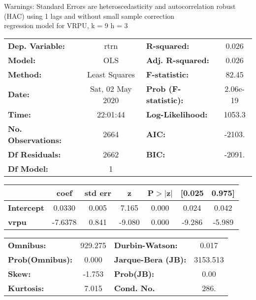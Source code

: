 Warnings: \newline
 [1] Standard Errors are heteroscedasticity and autocorrelation robust (HAC) using 1 lags and without small sample correction\\ 

regression model for VRPU, k = 9 h = 3\begin{center}
\begin{tabular}{lclc}
\toprule
\textbf{Dep. Variable:}    &       rtrn       & \textbf{  R-squared:         } &     0.026   \\
\textbf{Model:}            &       OLS        & \textbf{  Adj. R-squared:    } &     0.026   \\
\textbf{Method:}           &  Least Squares   & \textbf{  F-statistic:       } &     82.45   \\
\textbf{Date:}             & Sat, 02 May 2020 & \textbf{  Prob (F-statistic):} &  2.06e-19   \\
\textbf{Time:}             &     22:01:44     & \textbf{  Log-Likelihood:    } &    1053.3   \\
\textbf{No. Observations:} &        2664      & \textbf{  AIC:               } &    -2103.   \\
\textbf{Df Residuals:}     &        2662      & \textbf{  BIC:               } &    -2091.   \\
\textbf{Df Model:}         &           1      & \textbf{                     } &             \\
\bottomrule
\end{tabular}
\begin{tabular}{lcccccc}
                   & \textbf{coef} & \textbf{std err} & \textbf{z} & \textbf{P$> |$z$|$} & \textbf{[0.025} & \textbf{0.975]}  \\
\midrule
\textbf{Intercept} &       0.0330  &        0.005     &     7.165  &         0.000        &        0.024    &        0.042     \\
\textbf{vrpu}      &      -7.6378  &        0.841     &    -9.080  &         0.000        &       -9.286    &       -5.989     \\
\bottomrule
\end{tabular}
\begin{tabular}{lclc}
\textbf{Omnibus:}       & 929.275 & \textbf{  Durbin-Watson:     } &    0.017  \\
\textbf{Prob(Omnibus):} &   0.000 & \textbf{  Jarque-Bera (JB):  } & 3153.513  \\
\textbf{Skew:}          &  -1.753 & \textbf{  Prob(JB):          } &     0.00  \\
\textbf{Kurtosis:}      &   7.015 & \textbf{  Cond. No.          } &     286.  \\
\bottomrule
\end{tabular}
\end{center}

